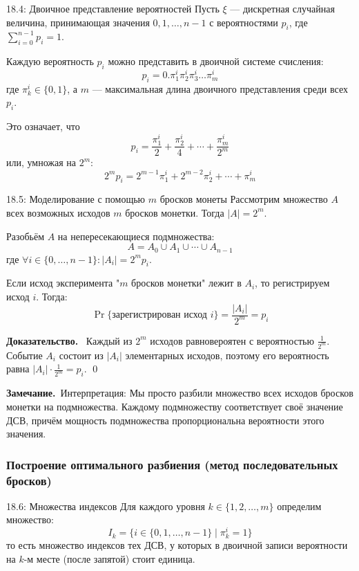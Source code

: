\documentclass[a4paper,12pt]{article}
\newcommand{\myproof}{\textbf{Доказательство.}\ }
\newcommand{\myremark}{\textbf{Замечание.}\ }
\begin{document}
	\begin{definitionbox}{18.4: Двоичное представление вероятностей}
		Пусть \(\xi\) — дискретная случайная величина, принимающая значения \(0, 1, \dots, n-1\) с вероятностями \(p_i\), где \(\sum_{i=0}^{n-1} p_i = 1\).
		
		Каждую вероятность \(p_i\) можно представить в двоичной системе счисления:
		\[ p_i = 0.\pi_1^i \pi_2^i \pi_3^i \dots \pi_m^i \]
		где \(\pi_k^i \in \{0, 1\}\), а \(m\) — максимальная длина двоичного представления среди всех \(p_i\).
		
		Это означает, что
		\[ p_i = \frac{\pi_1^i}{2} + \frac{\pi_2^i}{4} + \cdots + \frac{\pi_m^i}{2^m} \]
		или, умножая на \(2^m\):
		\[ 2^m p_i = 2^{m-1}\pi_1^i + 2^{m-2}\pi_2^i + \cdots + \pi_m^i \]
	\end{definitionbox}
	
	\begin{theorembox}{18.5: Моделирование с помощью \(m\) бросков монеты}
		Рассмотрим множество \(A\) всех возможных исходов \(m\) бросков монетки. Тогда \(|A| = 2^m\).
		
		Разобьём \(A\) на непересекающиеся подмножества:
		\[ A = A_0 \cup A_1 \cup \cdots \cup A_{n-1} \]
		где \(\forall i \in \{0, \dots, n-1\}: |A_i| = 2^m p_i\).
		
		Если исход эксперимента "\(m\) бросков монетки" лежит в \(A_i\), то регистрируем исход \(i\). Тогда:
		\[ \Pr\{\text{зарегистрирован исход } i\} = \frac{|A_i|}{2^m} = p_i \]
	\end{theorembox}
	
	\myproof
	Каждый из \(2^m\) исходов равновероятен с вероятностью \(\frac{1}{2^m}\). Событие \(A_i\) состоит из \(|A_i|\) элементарных исходов, поэтому его вероятность равна \(|A_i| \cdot \frac{1}{2^m} = p_i\). \qed
	
	\myremark{Интерпретация:} Мы просто разбили множество всех исходов бросков монетки на подмножества. Каждому подмножеству соответствует своё значение ДСВ, причём мощность подмножества пропорциональна вероятности этого значения.
	
	\subsubsection{Построение оптимального разбиения (метод последовательных бросков)}
	
	\begin{definitionbox}{18.6: Множества индексов}
		Для каждого уровня \(k \in \{1, 2, \dots, m\}\) определим множество:
		\[ I_k = \{ i \in \{0, 1, \dots, n-1\} \mid \pi_k^i = 1 \} \]
		то есть множество индексов тех ДСВ, у которых в двоичной записи вероятности на \(k\)-м месте (после запятой) стоит единица.
	\end{definitionbox}
	
\end{document}
